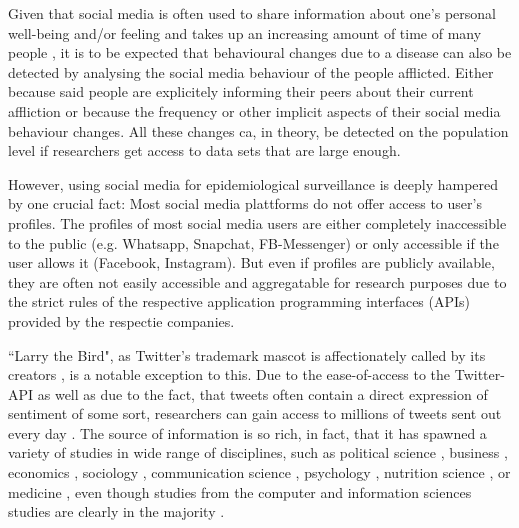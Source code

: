 \documentclass[11pt, a4paper,twoside]{report}\usepackage[]{graphicx}\usepackage[]{color}
\begin{document}
Given that social media is often used to share information about one's personal well-being and/or feeling and takes up an increasing amount of time of many people \citep{bauer_timeonline_2016,scott_time_2017,asano_socialmediatime_2017}, it is to be expected that behavioural changes due to a disease can also be detected by analysing the social media behaviour of the people afflicted. Either because said people are explicitely informing their peers about their current affliction or because the frequency or other implicit aspects of their social media behaviour changes. All these changes ca, in theory, be detected on the population level if researchers get access to data sets that are large enough.

However, using social media for epidemiological surveillance is deeply hampered by one crucial fact: Most social media plattforms do not offer access to user's profiles. The profiles of most social media users are either completely inaccessible to the public (e.g. Whatsapp, Snapchat, FB-Messenger) or only accessible if the user allows it (Facebook, Instagram). But even if profiles are publicly available, they are often not easily accessible and aggregatable for research purposes due to the strict rules of the respective application programming interfaces (APIs) provided by the respectie companies.

``Larry the Bird", as Twitter's trademark mascot is affectionately called by its creators \citep{rehak_twitterbird_2014}, is a notable exception to this. Due to the ease-of-access to the Twitter-API as well as due to the fact, that tweets often contain a direct expression of sentiment of some sort, researchers can gain access to millions of tweets sent out every day \citep{twitter_annual_2017}. The source of information is so rich, in fact, that it has spawned a variety of studies in wide range of disciplines, such as political science \citep{tumasjan2010predicting,tumasjan2011election,stieglitz2012political,newman2016tracking}, business \citep{swani2014should,chae2015insights}, economics \citep{bollen2011twitter,bollen2011modeling,zhang2012predicting,sul2014trading}, sociology \citep{poblete2011all,himelboim2013birds,mccormick2015using}, communication science \citep{zhao2009and,marwick2011tweet,himelboim2013birds,hermida2013journalism}, psychology \citep{chen2011tweet,golbeck2011predicting,qiu2012you,eichstaedt2015psychological,braithwaite2016validating}, nutrition science \citep{widener2014using,vidal2015using, abbar2015you}, or medicine \citep{salathe2013dynamics,love2013twitter,nwosu2014social,adrover2015identifying,eichstaedt2015psychological,mowery2017feature}, even though studies from the computer and information sciences studies are clearly in the majority \citep{lee2013real,zimmer2014topology,steiger2015advanced}. 
\end{document}
